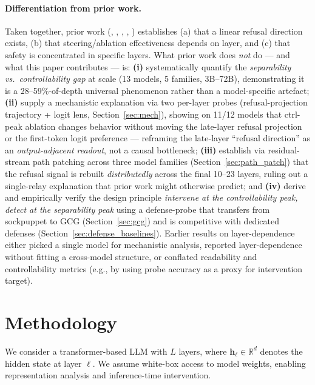 \documentclass{article}
\begin{document}
\paragraph{Differentiation from prior work.}
Taken together, prior work (\citet{arditi2024refusal}, \citet{panickssery2024caa}, \citet{turner2023activation}, \citet{zou2023representation}, \citet{wei2024brittleness}) establishes (a) that a linear refusal direction exists, (b) that steering/ablation effectiveness depends on layer, and (c) that safety is concentrated in specific layers. What prior work does \emph{not} do — and what this paper contributes — is: \textbf{(i)} systematically quantify the \emph{separability vs.\ controllability gap} at scale (13 models, 5 families, 3B--72B), demonstrating it is a 28--59\%-of-depth universal phenomenon rather than a model-specific artefact; \textbf{(ii)} supply a mechanistic explanation via two per-layer probes (refusal-projection trajectory + logit lens, Section~\ref{sec:mech}), showing on 11/12 models that ctrl-peak ablation changes behavior without moving the late-layer refusal projection or the first-token logit preference --- reframing the late-layer ``refusal direction'' as an \emph{output-adjacent readout}, not a causal bottleneck; \textbf{(iii)} establish via residual-stream path patching across three model families (Section~\ref{sec:path_patch}) that the refusal signal is rebuilt \emph{distributedly} across the final 10--23 layers, ruling out a single-relay explanation that prior work might otherwise predict; and \textbf{(iv)} derive and empirically verify the design principle \emph{intervene at the controllability peak, detect at the separability peak} using a defense-probe that transfers from sockpuppet to GCG (Section~\ref{sec:gcg}) and is competitive with dedicated defenses (Section~\ref{sec:defense_baselines}). Earlier results on layer-dependence either picked a single model for mechanistic analysis, reported layer-dependence without fitting a cross-model structure, or conflated readability and controllability metrics (e.g., by using probe accuracy as a proxy for intervention target).

\section{Methodology}

We consider a transformer-based LLM with $L$ layers, where $\mathbf{h}_\ell \in \mathbb{R}^d$ denotes the hidden state at layer $\ell$. We assume white-box access to model weights, enabling representation analysis and inference-time intervention.
\end{document}
